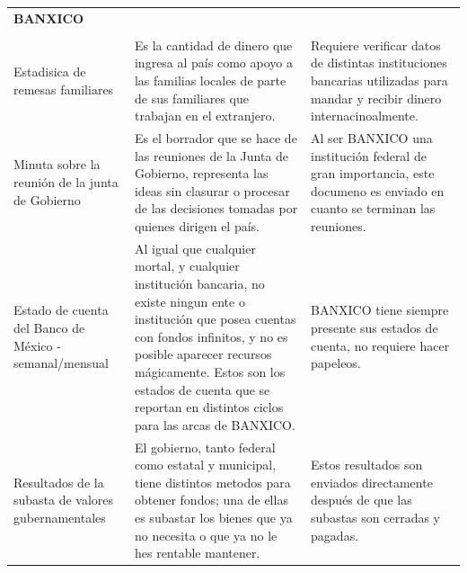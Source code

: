 \documentclass[12pt]{article}
\begin{document}
\begin{longtable}{|p{3cm}|p{7cm} p{4cm}|}
	\bf BANXICO \\ &  & \\
	Estadisica de remesas familiares & Es la cantidad de dinero que ingresa al pa\'is como apoyo a las familias locales de parte de sus familiares que trabajan en el extranjero. & Requiere verificar datos de distintas instituciones bancarias utilizadas para mandar y recibir dinero internacinoalmente. \\
	Minuta sobre la reuni\'on de la junta de Gobierno & Es el borrador que se hace de las reuniones de la Junta de Gobierno, representa las ideas sin clasurar o procesar de las decisiones tomadas por quienes dirigen el pa\'is. & Al ser BANXICO una instituci\'on federal de gran importancia, este documeno es enviado en cuanto se terminan las reuniones. \\
	Estado de cuenta del Banco de M\'exico - semanal/mensual & Al igual que cualquier mortal, y cualquier instituci\'on bancaria, no existe ningun ente o instituci\'on que posea cuentas con fondos infinitos, y no es posible aparecer recursos m\'agicamente. Estos son los estados de cuenta que se reportan en distintos ciclos para las arcas de BANXICO. & BANXICO tiene siempre presente sus estados de cuenta, no requiere hacer papeleos. \\
	Resultados de la subasta de valores gubernamentales & El gobierno, tanto federal como estatal y municipal, tiene distintos metodos para obtener fondos; una de ellas es subastar los bienes que ya no necesita o que ya no le hes rentable mantener. & Estos resultados son enviados directamente despu\'es de que las subastas son cerradas y pagadas. \\
	
\hline
\end{longtable}
\end{document}
